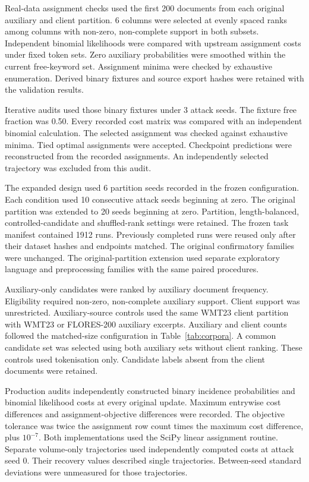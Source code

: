 \documentclass[pdflatex,sn-mathphys-num]{sn-jnl}%
\theoremstyle{thmstyleone}%
\theoremstyle{thmstyletwo}%
\theoremstyle{thmstylethree}%
\newcommand{\IterativeSeeds}{3}
\newcommand{\IterativeFreeFraction}{0.50}
\newcommand{\IndependentKeywords}{6}
\newcommand{\IndependentDocuments}{200}
\newcommand{\ExpandedPartitions}{6}
\newcommand{\ExpandedSeeds}{10}
\newcommand{\ExtendedSeeds}{20}
\newcommand{\ExpandedRunCount}{1912}
\begin{document}
Real-data assignment checks used the first \IndependentDocuments{} documents from each original auxiliary and client partition. \IndependentKeywords{} columns were selected at evenly spaced ranks among columns with non-zero, non-complete support in both subsets. Independent binomial likelihoods were compared with upstream assignment costs under fixed token sets. Zero auxiliary probabilities were smoothed within the current free-keyword set. Assignment minima were checked by exhaustive enumeration. Derived binary fixtures and source export hashes were retained with the validation results.

Iterative audits used those binary fixtures under \IterativeSeeds{} attack seeds. The fixture free fraction was \IterativeFreeFraction{}. Every recorded cost matrix was compared with an independent binomial calculation. The selected assignment was checked against exhaustive minima. Tied optimal assignments were accepted. Checkpoint predictions were reconstructed from the recorded assignments. An independently selected trajectory was excluded from this audit.

The expanded design used \ExpandedPartitions{} partition seeds recorded in the frozen configuration. Each condition used \ExpandedSeeds{} consecutive attack seeds beginning at zero. The original partition was extended to \ExtendedSeeds{} seeds beginning at zero. Partition, length-balanced, controlled-candidate and shuffled-rank settings were retained. The frozen task manifest contained \ExpandedRunCount{} runs. Previously completed runs were reused only after their dataset hashes and endpoints matched. The original confirmatory families were unchanged. The original-partition extension used separate exploratory language and preprocessing families with the same paired procedures.

Auxiliary-only candidates were ranked by auxiliary document frequency. Eligibility required non-zero, non-complete auxiliary support. Client support was unrestricted. Auxiliary-source controls used the same WMT23 client partition with WMT23 or FLORES-200 auxiliary excerpts. Auxiliary and client counts followed the matched-size configuration in Table~\ref{tab:corpora}. A common candidate set was selected using both auxiliary sets without client ranking. These controls used tokenisation only. Candidate labels absent from the client documents were retained.

Production audits independently constructed binary incidence probabilities and binomial likelihood costs at every original update. Maximum entrywise cost differences and assignment-objective differences were recorded. The objective tolerance was twice the assignment row count times the maximum cost difference, plus $10^{-7}$. Both implementations used the SciPy linear assignment routine. Separate volume-only trajectories used independently computed costs at attack seed 0. Their recovery values described single trajectories. Between-seed standard deviations were unmeasured for those trajectories.
\end{document}

